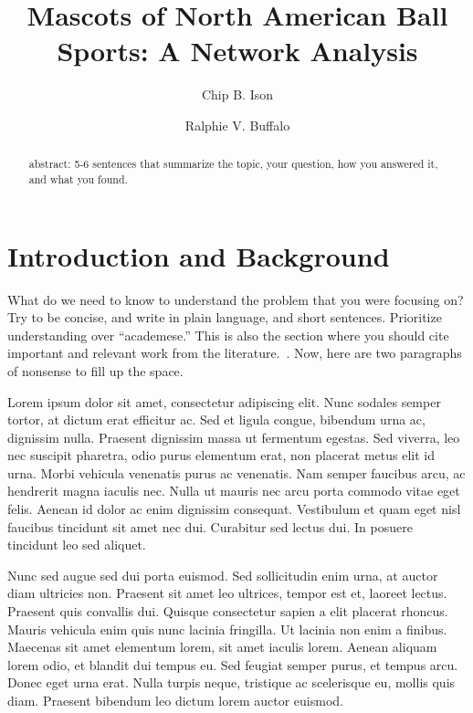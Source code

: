 \documentclass[10pt,twocolumn,superscriptaddress,notitlepage]{revtex4-1}
\begin{document}
\author{Chip B. Ison}
\author{Ralphie V. Buffalo}
\title{Mascots of North American Ball Sports: A Network Analysis}
\begin{abstract}
abstract: 5-6 sentences that summarize the topic, your question, how you answered it, and what you found. 
\end{abstract}
\maketitle


\section{Introduction and Background}

What do we need to know to understand the problem that you were focusing on? Try to be concise, and write in plain language, and short sentences. Prioritize understanding over ``academese.''  This is also the section where you should cite important and relevant work from the literature.~\cite{ramos2019social}.  Now, here are two paragraphs of nonsense to fill up the space.

Lorem ipsum dolor sit amet, consectetur adipiscing elit. Nunc sodales semper tortor, at dictum erat efficitur ac. Sed et ligula congue, bibendum urna ac, dignissim nulla. Praesent dignissim massa ut fermentum egestas. Sed viverra, leo nec suscipit pharetra, odio purus elementum erat, non placerat metus elit id urna. Morbi vehicula venenatis purus ac venenatis. Nam semper faucibus arcu, ac hendrerit magna iaculis nec. Nulla ut mauris nec arcu porta commodo vitae eget felis. Aenean id dolor ac enim dignissim consequat. Vestibulum et quam eget nisl faucibus tincidunt sit amet nec dui. Curabitur sed lectus dui. In posuere tincidunt leo sed aliquet.

Nunc sed augue sed dui porta euismod. Sed sollicitudin enim urna, at auctor diam ultricies non. Praesent sit amet leo ultrices, tempor est et, laoreet lectus. Praesent quis convallis dui. Quisque consectetur sapien a elit placerat rhoncus. Mauris vehicula enim quis nunc lacinia fringilla. Ut lacinia non enim a finibus. Maecenas sit amet elementum lorem, sit amet iaculis lorem. Aenean aliquam lorem odio, et blandit dui tempus eu. Sed feugiat semper purus, et tempus arcu. Donec eget urna erat. Nulla turpis neque, tristique ac scelerisque eu, mollis quis diam. Praesent bibendum leo dictum lorem auctor euismod. 
\end{document}
